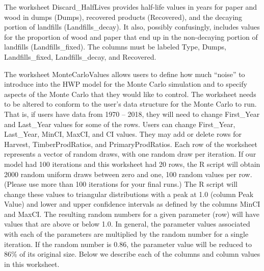 \documentclass[
]{book}
\begin{document}
The worksheet Discard\_HalfLives provides half-life values in years for paper and wood in dumps (Dumps), recovered products (Recovered), and the decaying portion of landfills (Landfills\_decay). It also, possibly confusingly, includes values for the proportion of wood and paper that end up in the non-decaying portion of landfills (Landfills\_fixed). The columns must be labeled Type, Dumps, Landfills\_fixed, Landfills\_decay, and Recovered.

The worksheet MonteCarloValues allows users to define how much ``noise'' to introduce into the HWP model for the Monte Carlo simulation and to specify aspects of the Monte Carlo that they would like to control. The worksheet needs to be altered to conform to the user's data structure for the Monte Carlo to run. That is, if users have data from 1970 -- 2018, they will need to change First\_Year and Last\_Year values for some of the rows. Users can change First\_Year, Last\_Year, MinCI, MaxCI, and CI values. They may add or delete rows for Harvest, TimberProdRatios, and PrimaryProdRatios. Each row of the worksheet represents a vector of random draws, with one random draw per iteration. If our model had 100 iterations and this worksheet had 20 rows, the R script will obtain 2000 random uniform draws between zero and one, 100 random values per row. (Please use more than 100 iterations for your final runs.) The R script will change these values to triangular distributions with a peak at 1.0 (column Peak Value) and lower and upper confidence intervals as defined by the columns MinCI and MaxCI. The resulting random numbers for a given parameter (row) will have values that are above or below 1.0. In general, the parameter values associated with each of the parameters are multiplied by the random number for a single iteration. If the random number is 0.86, the parameter value will be reduced to 86\% of its original size. Below we describe each of the columns and column values in this worksheet.
\end{document}
